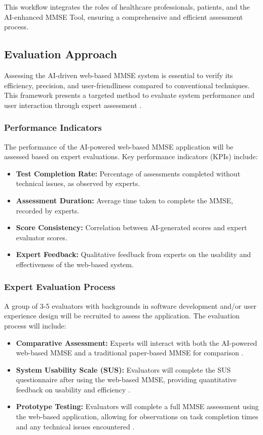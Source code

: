 This workflow integrates the roles of healthcare professionals, patients, and the AI-enhanced MMSE Tool, ensuring a comprehensive and efficient assessment process.




\subsection{Evaluation Approach}
Assessing the AI-driven web-based MMSE system is essential to verify its efficiency, precision, and user-friendliness compared to conventional techniques. This framework presents a targeted method to evaluate system performance and user interaction through expert assessment \cite{Greenhalgh2017}.

\subsubsection{Performance Indicators}
The performance of the AI-powered web-based MMSE application will be assessed based on expert evaluations. Key performance indicators (KPIs) include:
\begin{itemize}
\item \textbf{Test Completion Rate:} Percentage of assessments completed without technical issues, as observed by experts.
\item \textbf{Assessment Duration:} Average time taken to complete the MMSE, recorded by experts.
\item \textbf{Score Consistency:} Correlation between AI-generated scores and expert evaluator scores.
\item \textbf{Expert Feedback:} Qualitative feedback from experts on the usability and effectiveness of the web-based system.
\end{itemize}

\subsubsection{Expert Evaluation Process}
A group of 3-5 evaluators with backgrounds in software development and/or user experience design will be recruited to assess the application. The evaluation process will include:
\begin{itemize}
\item \textbf{Comparative Assessment:} Experts will interact with both the AI-powered web-based MMSE and a traditional paper-based MMSE for comparison \cite{Bauer2012}.
\item \textbf{System Usability Scale (SUS):} Evaluators will complete the SUS questionnaire after using the web-based MMSE, providing quantitative feedback on usability and efficiency \cite{Brooke1996}.
\item \textbf{Prototype Testing:} Evaluators will complete a full MMSE assessment using the web-based application, allowing for observations on task completion times and any technical issues encountered \cite{Zygouris2017}.
\end{itemize}

